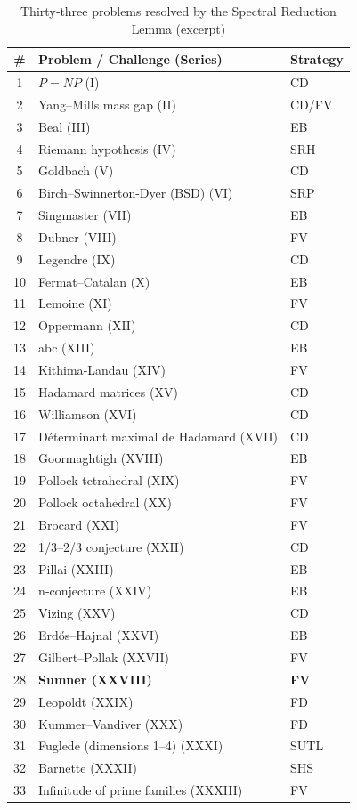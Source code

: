 \documentclass[11pt,a4paper]{article}
\begin{document}
\begin{center}
\small
\begin{longtable}{@{}cll@{}}
\caption{Thirty‑three problems resolved by the Spectral Reduction Lemma (excerpt)}\\
\toprule
\# & Problem / Challenge (Series) & Strategy \\
\midrule
1 & \(P = NP\) (I) & CD \\
2 & Yang–Mills mass gap (II) & CD/FV \\
3 & Beal (III) & EB \\
4 & Riemann hypothesis (IV) & SRH \\
5 & Goldbach (V) & CD \\
6 & Birch–Swinnerton-Dyer (BSD) (VI) & SRP \\
7 & Singmaster (VII) & EB \\
8 & Dubner (VIII) & FV \\
9 & Legendre (IX) & CD \\
10 & Fermat–Catalan (X) & EB \\
11 & Lemoine (XI) & FV \\
12 & Oppermann (XII) & CD \\
13 & abc (XIII) & EB \\
14 & Kithima‑Landau (XIV) & FV \\
15 & Hadamard matrices (XV) & CD \\
16 & Williamson (XVI) & CD \\
17 & Déterminant maximal de Hadamard (XVII) & CD \\
18 & Goormaghtigh (XVIII) & EB \\
19 & Pollock tetrahedral (XIX) & FV \\
20 & Pollock octahedral (XX) & FV \\
21 & Brocard (XXI) & FV \\
22 & 1/3–2/3 conjecture (XXII) & CD \\
23 & Pillai (XXIII) & EB \\
24 & n‑conjecture (XXIV) & EB \\
25 & Vizing (XXV) & CD \\
26 & Erdős–Hajnal (XXVI) & EB \\
27 & Gilbert–Pollak (XXVII) & FV \\
28 & \textbf{Sumner (XXVIII)} & \textbf{FV} \\
29 & Leopoldt (XXIX) & FD \\
30 & Kummer–Vandiver (XXX) & FD \\
31 & Fuglede (dimensions 1–4) (XXXI) & SUTL \\
32 & Barnette (XXXII) & SHS \\
33 & Infinitude of prime families (XXXIII) & FV \\
\bottomrule
\end{longtable}
\end{center}
\end{document}
